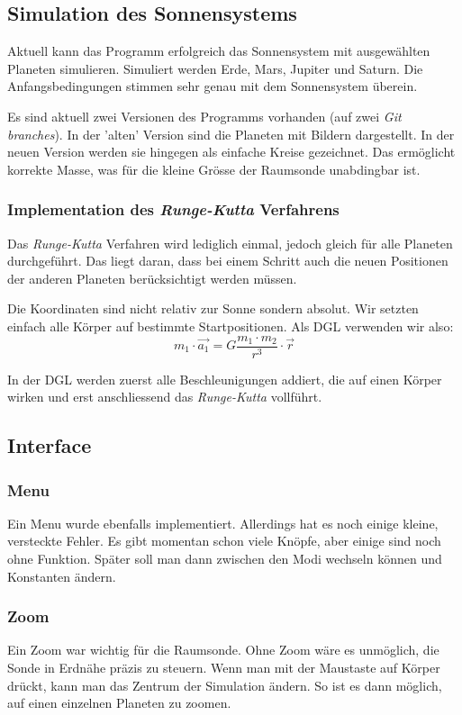 \documentclass{article}
\begin{document}
\subsection{Simulation des Sonnensystems}
Aktuell kann das Programm erfolgreich das Sonnensystem mit ausgewählten Planeten simulieren. Simuliert werden Erde, Mars, Jupiter und Saturn. Die Anfangsbedingungen stimmen sehr genau mit dem Sonnensystem überein.

Es sind aktuell zwei Versionen des Programms vorhanden (auf zwei \textit{Git branches}). In der 'alten' Version sind die Planeten mit Bildern dargestellt. In der neuen Version werden sie hingegen als einfache Kreise gezeichnet. Das ermöglicht korrekte Masse, was für die kleine Grösse der Raumsonde unabdingbar ist.
\subsubsection{Implementation des \textit{Runge-Kutta }Verfahrens}
Das \textit{Runge-Kutta} Verfahren wird lediglich einmal, jedoch gleich für alle Planeten durchgeführt. Das liegt daran, dass bei einem Schritt auch die neuen Positionen der anderen Planeten berücksichtigt werden müssen.

Die Koordinaten sind nicht relativ zur Sonne sondern absolut. Wir setzten einfach alle Körper auf bestimmte Startpositionen. Als DGL verwenden wir also: $$ m_1 \cdot \vec{a_1} = G \frac{m_1 \cdot m_2}{r^3} \cdot  \vec{r}$$

In der DGL werden zuerst alle Beschleunigungen addiert, die auf einen Körper wirken und erst anschliessend das \textit{Runge-Kutta} vollführt.
\subsection{Interface}
\subsubsection{Menu}
Ein Menu wurde ebenfalls implementiert. Allerdings hat es noch einige kleine, versteckte Fehler. Es gibt momentan schon viele Knöpfe, aber einige sind noch ohne Funktion. Später soll man dann zwischen den Modi wechseln können und Konstanten ändern.
\subsubsection{Zoom}
Ein Zoom war wichtig für die Raumsonde. Ohne Zoom wäre es unmöglich, die Sonde in Erdnähe präzis zu steuern. Wenn man mit der Maustaste auf Körper drückt, kann man das Zentrum der Simulation ändern. So ist es dann möglich, auf einen einzelnen Planeten zu zoomen.
\end{document}
